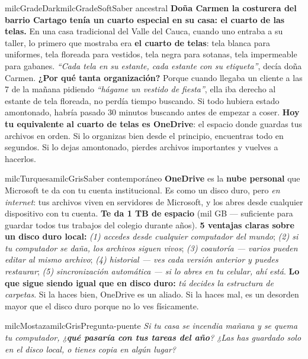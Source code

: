 \documentclass[11pt,letterpaper]{article}
\begin{document}
\begin{softbox}{milcGradeDark}{milcGradeSoft}{Saber ancestral}
\textbf{Doña Carmen la costurera del barrio Cartago tenía un cuarto especial en su casa: el cuarto de las telas.} En una casa tradicional del Valle del Cauca, cuando uno entraba a su taller, lo primero que mostraba era \textbf{el cuarto de telas}: tela blanca para uniformes, tela floreada para vestidos, tela negra para sotanas, tela impermeable para gabanes. \emph{``Cada tela en su estante, cada estante con su etiqueta''}, decía doña Carmen. \textbf{¿Por qué tanta organización?} Porque cuando llegaba un cliente a las 7 de la mañana pidiendo \emph{``hágame un vestido de fiesta''}, ella iba derecho al estante de tela floreada, no perdía tiempo buscando. Si todo hubiera estado amontonado, habría pasado 30 minutos buscando antes de empezar a coser. \textbf{Hoy tu equivalente al cuarto de telas es OneDrive}: el espacio donde guardas tus archivos en orden. Si lo organizas bien desde el principio, encuentras todo en segundos. Si lo dejas amontonado, pierdes archivos importantes y vuelves a hacerlos.
\end{softbox}

\begin{softbox}{milcTurquesa}{milcGris}{Saber contemporáneo}
\textbf{OneDrive} es la \textbf{nube personal} que Microsoft te da con tu cuenta institucional. Es como un disco duro, pero \emph{en internet}: tus archivos viven en servidores de Microsoft, y los abres desde cualquier dispositivo con tu cuenta. \textbf{Te da 1 TB de espacio} (mil GB --- suficiente para guardar todos tus trabajos del colegio durante años). \textbf{5 ventajas claras sobre un disco duro local:} \emph{(1) accedes desde cualquier computador del mundo}; \emph{(2) si tu computador se daña, los archivos siguen vivos}; \emph{(3) coautoría --- varios pueden editar al mismo archivo}; \emph{(4) historial --- ves cada versión anterior y puedes restaurar}; \emph{(5) sincronización automática --- si lo abres en tu celular, ahí está}. \textbf{Lo que sigue siendo igual que en disco duro:} \emph{tú decides la estructura de carpetas}. Si la haces bien, OneDrive es un aliado. Si la haces mal, es un desorden mayor que el disco duro porque no lo ves físicamente.
\end{softbox}

\begin{softbox}{milcMostaza}{milcGris}{Pregunta-puente}
\textit{Si tu casa se incendia mañana y se quema tu computador, ¿\textbf{qué pasaría con tus tareas del año}? ¿Las has guardado solo en el disco local, o tienes copia en algún lugar?}
\end{softbox}
\end{document}
